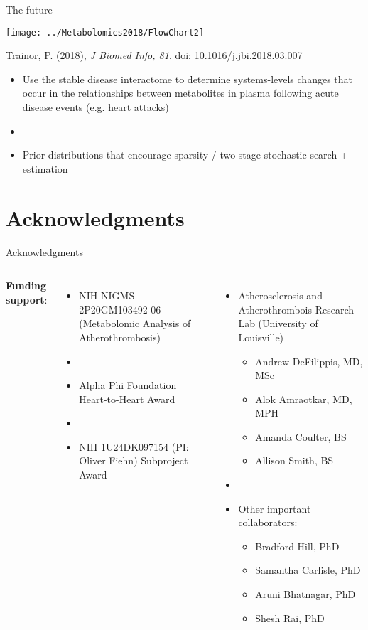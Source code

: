 \documentclass[xcolor=dvipsnames]{beamer}
\begin{document}
\begin{frame}{The future}
	\vspace{-15pt}
	\begin{center}
		\texttt{[image: ../Metabolomics2018/FlowChart2]}
		
		Trainor, P. (2018), \emph{J Biomed Info, 81}. doi: 10.1016/j.jbi.2018.03.007 \pause
	\end{center}
	\begin{itemize}
		\item Use the stable disease interactome to determine systems-levels changes that occur in the relationships between metabolites in plasma following acute disease events (e.g. heart attacks) \pause
		\item[]
		\item Prior distributions that encourage sparsity / two-stage stochastic search + estimation 
	\end{itemize}
\end{frame}

\section{Acknowledgments}

\begin{frame}{Acknowledgments}
	\begin{columns}
			\textbf{Funding support}:
			\begin{itemize}
				\item NIH NIGMS 2P20GM103492-06 (Metabolomic Analysis of Atherothrombosis)
				\item[]
				\item Alpha Phi Foundation Heart-to-Heart Award
				\item[]
				\item NIH 1U24DK097154 (PI: Oliver Fiehn) Subproject Award
			\end{itemize}
			\begin{itemize}
				\item Atherosclerosis and Atherothrombois Research Lab (University of Louisville)
				\begin{itemize}
					\item Andrew DeFilippis, MD, MSc
					\item Alok Amraotkar, MD, MPH
					\item Amanda Coulter, BS
					\item Allison Smith, BS
				\end{itemize}
				\item[]
				\item Other important collaborators:
				\begin{itemize}
					\item Bradford Hill, PhD
					\item Samantha Carlisle, PhD
					\item Aruni Bhatnagar, PhD
					\item Shesh Rai, PhD
				\end{itemize}
			\end{itemize}
	\end{columns}
\end{frame}
\end{document}
